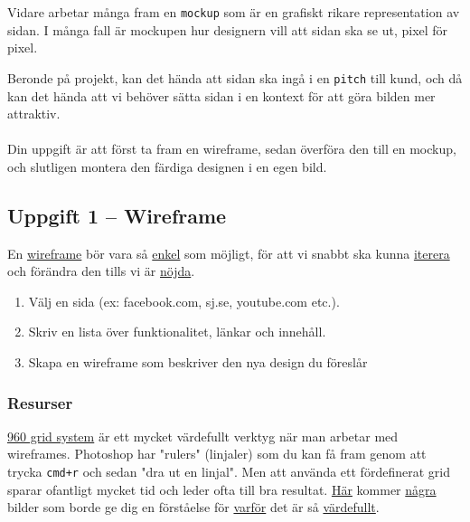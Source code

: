 \documentclass{article}
\begin{document}
    Vidare arbetar många fram en \texttt{mockup} som är en grafiskt rikare representation av sidan. I många fall är mockupen hur designern vill att sidan ska se ut, pixel för pixel.

    Beronde på projekt, kan det hända att sidan ska ingå i en \texttt{pitch} till kund, och då kan det hända att vi behöver sätta sidan i en kontext för att göra bilden mer attraktiv.

    \paragraph{}
    Din uppgift är att först ta fram en wireframe, sedan överföra den till en mockup, och slutligen montera den färdiga designen i en egen bild.

    \subsection*{Uppgift 1 -- Wireframe}
      En
      \href{http://blog.radarhill.com/wp-content/uploads/2012/09/wireframe01.jpg}{wireframe}
      bör vara så
      \href{http://3.bp.blogspot.com/-VHAxXdC678w/T05IKQILbWI/AAAAAAAAAYE/_fIZt0IQEew/s1600/Wireframe_WebPeekaboo-ShopAge.png}{enkel}
      som möjligt,
      för att vi snabbt ska kunna
      \href{http://www.cesarinla.com/boomers/images/project/web_wireframe/web_wireframe02_04.jpg}{iterera}
      och förändra den
      tills vi är
      \href{http://www.wirify.com/wp/wp-content/uploads/2011/02/CNN-International-Original-vs-Wirify-wireframe1.jpg}{nöjda}.

      \begin{enumerate}
        \item Välj en sida (ex: facebook.com, sj.se, youtube.com etc.).
        \item Skriv en lista över funktionalitet, länkar och innehåll.
        \item Skapa en wireframe som beskriver den nya design du föreslår
      \end{enumerate}

      \subsubsection*{Resurser}
      \href{http://960.gs/}{960 grid system}
      är ett mycket värdefullt verktyg när man arbetar med wireframes. Photoshop har "rulers" (linjaler) som du kan få fram genom att trycka \texttt{cmd+r} och sedan "dra ut en linjal". Men att använda ett fördefinerat grid sparar ofantligt mycket tid och leder ofta till bra resultat.
      \href{http://uxmovement.com/wp-content/uploads/2010/12/textimages.png}{Här}
      kommer
      \href{https://drupal.org/files/images/OMEGA_WIREFRAME-FIRST-BODY-LAST.preview.png}{några}
      bilder
      som borde ge dig en förståelse för
      \href{http://images.sixrevisions.com/2010/07/12-03_12columngrid.jpg}{varför}
      det är så
      \href{http://netdna.webdesignerdepot.com/uploads/grid_based_layout_designs/woothemes-960gs-gutters.jpg}{värdefullt}.
\end{document}
